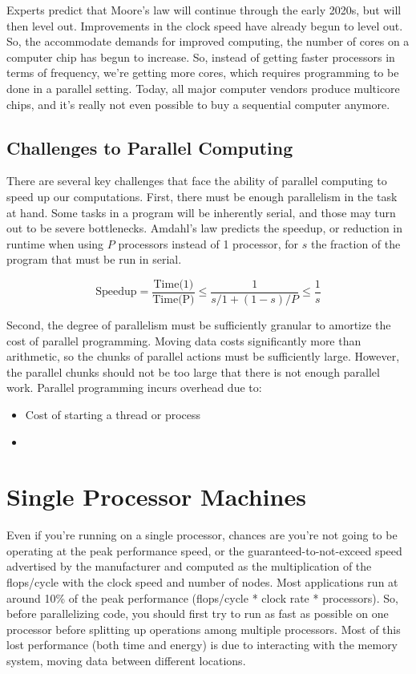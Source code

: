 \documentclass[10pt]{article}
\begin{document}
\begin{flushleft}
Experts predict that Moore's law will continue through the early 2020s, but will then level out. Improvements in the clock speed have already begun to level out. So, the accommodate demands for improved computing, the number of cores on a computer chip has begun to increase. So, instead of getting faster processors in terms of frequency, we're getting more cores, which requires programming to be done in a parallel setting. Today, all major computer vendors produce multicore chips, and it's really not even possible to buy a sequential computer anymore.

\subsection{Challenges to Parallel Computing}

There are several key challenges that face the ability of parallel computing to speed up our computations. First, there must be enough parallelism in the task at hand. Some tasks in a program will be inherently serial, and those may turn out to be severe bottlenecks. Amdahl's law predicts the speedup, or reduction in runtime when using \(P\) processors instead of 1 processor, for \(s\) the fraction of the program that must be run in serial.

\begin{equation}
\textrm{Speedup}=\frac{\textrm{Time(1)}}{\textrm{Time(P)}}\leq\frac{1}{s/1+(1-s)/P}\leq\frac{1}{s}
\end{equation}

Second, the degree of parallelism must be sufficiently granular to amortize the cost of parallel programming. Moving data costs significantly more than arithmetic, so the chunks of parallel actions must be sufficiently large. However, the parallel chunks should not be too large that there is not enough parallel work. Parallel programming incurs overhead due to:

\begin{itemize}
\item Cost of starting a thread or process
\item 
\end{itemize}

\section{Single Processor Machines}
 
Even if you're running on a single processor, chances are you're not going to be operating at the peak performance speed, or the guaranteed-to-not-exceed speed advertised by the manufacturer and computed as the multiplication of the flops/cycle with the clock speed and number of nodes. Most applications run at around 10\% of the peak performance (flops/cycle * clock rate * processors). So, before parallelizing code, you should first try to run as fast as possible on one processor before splitting up operations among multiple processors. Most of this lost performance (both time and energy) is due to interacting with the memory system, moving data between different locations. 


\end{flushleft}
\end{document}
